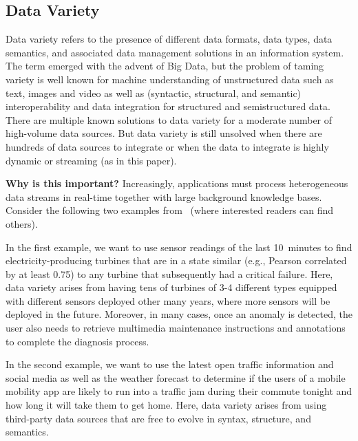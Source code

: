 \subsection{Data Variety}

Data variety refers to the presence of different data formats, data
types, data semantics, and associated data management solutions in an
information system. The term emerged with the advent of Big Data, but
the problem of taming variety is well known for machine understanding
of unstructured data such as text, images and video as well as
(syntactic, structural, and semantic) interoperability and data
integration for structured and semistructured data.  There are
multiple known solutions to data variety for a moderate number of
high-volume data sources.  But data variety is still unsolved when
there are hundreds of data sources to integrate or when the data to
integrate is highly dynamic or streaming (as in this paper).

\textbf{Why is this important?}
%
Increasingly, applications must process heterogeneous data streams in
real-time together with large background knowledge bases. Consider the
following two examples from~\cite{DellAglioDataScience2017} (where interested readers can find others).

In the first example, we want to use sensor readings of the last
10~minutes to find electricity-producing turbines that are in a state
similar (e.g., Pearson correlated by at least 0.75) to any turbine
that subsequently had a critical failure. Here, data variety arises
from having tens of turbines of 3-4 different types equipped with
different sensors deployed other many years, where more sensors will be
deployed in the future. Moreover, in many cases, once an anomaly is
detected, the user also needs to retrieve multimedia maintenance
instructions and annotations to complete the diagnosis process.

In the second example, we want to use the latest open traffic
information and social media as well as the weather forecast to
determine if the users of a mobile mobility app are likely to run into
a traffic jam during their commute tonight and how long it will take
them to get home. Here, data variety arises from using third-party
data sources that are free to evolve in syntax, structure, and
semantics.


